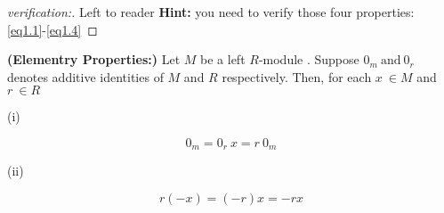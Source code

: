 \begin{proof}
[verification:]
	Left to reader\newline \bigskip
	\textbf{Hint:} you need to verify those four properties: \eqref{eq1.1}-\eqref{eq1.4}

\end{proof}
\bigskip

\begin{thm}
{\textbf{(Elementry Properties:)} }\newline
	Let $M$ be a left $R$-module . Suppose $0_m \ \text{and} \ 0_r$ denotes additive identities of $M$ and $R$ respectively. Then,  for each $x \ \in M$ and $r \ \in R$ \newline

\begin{description}
\item (i)

\begin{equation*}
	0_m = 0_r\ x = r\ 0_m
	
\end{equation*}
\item (ii)

\begin{equation*}
	r(-x) =  (-r)x = -rx
	
\end{equation*}

\end{description}

\end{thm}

